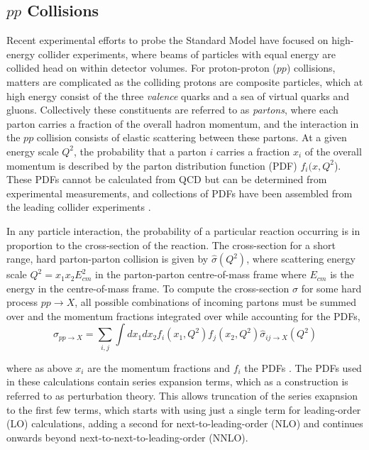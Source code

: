 	\subsection{$pp$ Collisions}
	\label{t:ppc}
	Recent experimental efforts to probe the Standard Model have focused on high-energy collider experiments, where beams of particles with equal energy are collided head on within detector volumes.  For proton-proton ($pp$) collisions, matters are complicated as the colliding protons are composite particles, which at high energy consist of the three \textit{valence} quarks and a sea of virtual quarks and gluons. Collectively these constituents are referred to as \textit{partons}, where each parton carries a fraction of the overall hadron momentum, and the interaction in the $pp$ collision consists of elastic scattering between these partons. At a given energy scale $Q^2$, the probability that a parton $i$ carries a fraction $x_i$ of the overall momentum is described by the parton distribution function (PDF) $f_i(x, Q^2$). These PDFs cannot be calculated from QCD but can be determined from experimental measurements, and collections of PDFs have been assembled from the leading collider experiments \cite{hardinteractions, pdfs}.

	In any particle interaction, the probability of a particular reaction occurring is in proportion to the cross-section of the reaction. The cross-section for a short range, hard parton-parton collision is given by $\hat{\sigma}(Q^2)$, where scattering energy scale $Q^2 = x_1x_2E^2_{cm}$ in the parton-parton centre-of-mass frame where $E_{cm}$ is the energy in the centre-of-mass frame. To compute the cross-section $\sigma$ for some hard process $pp\rightarrow X$, all possible combinations of incoming partons must be summed over and the momentum fractions integrated over while accounting for the PDFs,
	\begin{equation}
	\label{eq:hard}
	\sigma_{pp\rightarrow X} = \sum_{i, j} \int dx_1dx_2f_i(x_1, Q^2)f_j(x_2, Q^2)\hat{\sigma}_{ij\rightarrow X}(Q^2)
	\end{equation}

	where as above $x_i$ are the momentum fractions and $f_i$ the PDFs \cite{hardinteractions}. The PDFs used in these calculations contain series expansion terms, which as a construction is referred to as perturbation theory. This allows truncation of the series exapnsion to the first few terms, which starts with using just a single term for leading-order (LO) calculations, adding a second for next-to-leading-order (NLO) and continues onwards beyond next-to-next-to-leading-order (NNLO)\cite{hardinteractions}.
